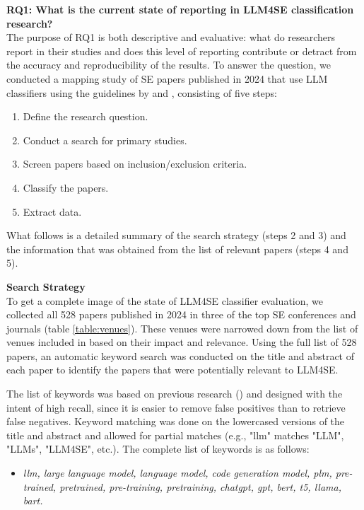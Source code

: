 \documentclass[a4paper]{article}
\newcommand{\emphasize}[1]{\textbf{#1}}
\begin{document}
\emphasize{RQ1: What is the current state of reporting in LLM4SE classification research?} \\
The purpose of RQ1 is both descriptive and evaluative: what do researchers report in their studies and does this level of reporting contribute or detract from the accuracy and reproducibility of the results. To answer the question, we conducted a mapping study of SE papers published in 2024 that use LLM classifiers using the guidelines by \citeauthor{kitchenham2011} \cite{kitchenham2011,kitchenham2007} and \textcite{petersen2008map}, consisting of five steps:
\begin{enumerate}
	\item Define the research question.
	\item Conduct a search for primary studies.
	\item Screen papers based on inclusion/exclusion criteria.
	\item Classify the papers.
	\item Extract data. 
\end{enumerate}
 What follows is a detailed summary of the search strategy (steps 2 and 3) and the information that was obtained from the list of relevant papers (steps 4 and 5). 

\textbf{Search Strategy}\\
To get a complete image of the state of LLM4SE classifier evaluation, we collected all 528 papers published in 2024 in three of the top SE conferences and journals (table \ref{table:venues}). These venues were narrowed down from the list of venues included in \cite{hou2024} based on their impact and relevance. Using the full list of 528 papers, an automatic keyword search was conducted on the title and abstract of each paper to identify the papers that were potentially relevant to LLM4SE.

The list of keywords was based on previous research (\cite{zhang2024,hou2024}) and designed with the intent of high recall, since it is easier to remove false positives than to retrieve false negatives. Keyword matching was done on the lowercased versions of the title and abstract and allowed for partial matches (e.g., "llm" matches "LLM", "LLMs", "LLM4SE", etc.). The complete list of keywords is as follows:
\begin{itemize}
	\item \textit{llm, large language model, language model, code generation model, plm, pre-trained, pretrained, pre-training, pretraining, chatgpt, gpt, bert, t5, llama, bart.}
\end{itemize}
\end{document}
